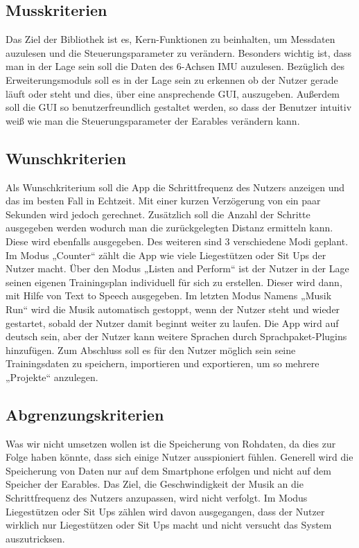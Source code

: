\documentclass[a4paper,12pt]{article}
\begin{document}
\subsection{Musskriterien}
Das Ziel der Bibliothek ist es, Kern-Funktionen zu beinhalten, um Messdaten auzulesen und die Steuerungsparameter zu verändern. Besonders wichtig ist, dass man in der Lage sein soll die Daten des 6-Achsen IMU auzulesen. Bezüglich des Erweiterungsmoduls soll es in der Lage sein zu erkennen ob der Nutzer gerade läuft oder steht und dies, über eine ansprechende GUI, auszugeben. Außerdem soll die GUI so benutzerfreundlich gestaltet werden, so dass der Benutzer intuitiv weiß wie man die Steuerungsparameter der Earables verändern kann.
\subsection{Wunschkriterien}
Als Wunschkriterium soll die App die Schrittfrequenz des Nutzers anzeigen und das im besten Fall in Echtzeit. Mit einer kurzen Verzögerung von ein paar Sekunden wird jedoch gerechnet. Zusätzlich soll die Anzahl der Schritte ausgegeben werden wodurch man die zurückgelegten Distanz ermitteln kann. Diese wird ebenfalls ausgegeben. Des weiteren sind 3 verschiedene Modi geplant. Im Modus „Counter“ zählt die App wie viele Liegestützen oder Sit Ups der Nutzer macht. Über den Modus „Listen and Perform“ ist der Nutzer in der Lage seinen eigenen Trainingsplan individuell für sich zu erstellen. Dieser wird dann, mit Hilfe von Text to Speech ausgegeben. Im letzten Modus Namens „Musik Run“ wird die Musik automatisch gestoppt, wenn der Nutzer steht und wieder gestartet, sobald der Nutzer damit beginnt weiter zu laufen. Die App wird auf deutsch sein, aber der Nutzer kann weitere Sprachen durch Sprachpaket-Plugins hinzufügen. Zum Abschluss soll es für den Nutzer möglich sein seine Trainingsdaten zu speichern, importieren und exportieren, um so mehrere „Projekte“ anzulegen.
  \subsection{Abgrenzungskriterien}
Was wir nicht umsetzen wollen ist die Speicherung von Rohdaten, da dies zur Folge haben könnte, dass sich einige Nutzer ausspioniert fühlen. Generell wird die Speicherung von Daten nur auf dem Smartphone erfolgen und nicht auf dem Speicher der Earables. Das Ziel, die Geschwindigkeit der Musik an die Schrittfrequenz des Nutzers anzupassen, wird nicht verfolgt. Im Modus Liegestützen oder Sit Ups zählen wird davon ausgegangen, dass der Nutzer wirklich nur Liegestützen oder Sit Ups macht und nicht versucht das System auszutricksen.
\end{document}
